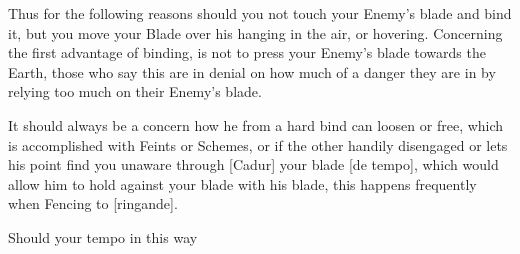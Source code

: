 Thus for the following reasons should you not touch your Enemy's blade
and bind it, but you move your Blade over his hanging in the
air, or hovering. Concerning the first
advantage of binding, is not to press your Enemy's blade
towards the Earth, those who say this are in denial on how much of a
danger they are in by relying too much on their Enemy's blade. 

It should always be a concern how he from a hard bind can loosen or
free, which is accomplished with Feints or Schemes, or if the other
handily disengaged or lets his point find you unaware through [Cadur]
your blade [de tempo], which would allow him to hold against your
blade with his blade, this happens frequently when Fencing to
[ringande].

Should your tempo in this way